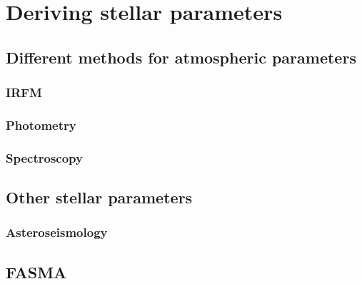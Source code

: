 \chapter{Deriving stellar parameters}
\label{cha:method}


\section{Different methods for atmospheric parameters}

\subsection{IRFM}

\subsection{Photometry}

\subsection{Spectroscopy}


\section{Other stellar parameters}

\subsection{Asteroseismology}


\section{FASMA}
